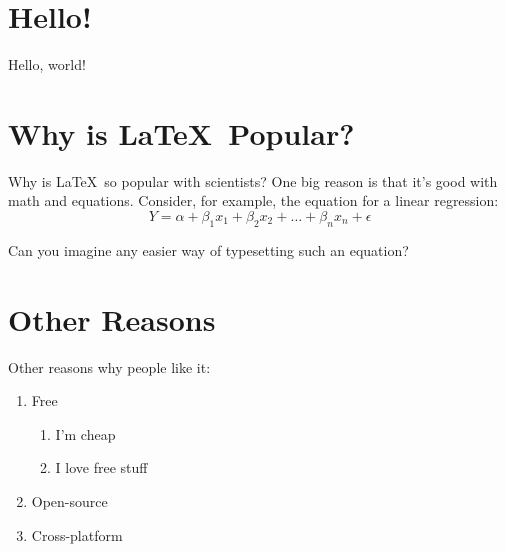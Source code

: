 \documentclass{article}
\begin{document}
\tableofcontents
\newpage

\section{Hello!}
Hello, world! \\

\section{Why is \LaTeX\ Popular?}
Why is \LaTeX\ so popular with scientists? One big reason is that it's good with math and equations. Consider, for example, the equation for a linear regression: $$Y = \alpha + \beta_1x_1 + \beta_2x_2 + \ldots + \beta_nx_n + \epsilon$$

Can you imagine any easier way of typesetting such an equation? \\

\section{Other Reasons}
\noindent
Other reasons why people like it:
\begin{enumerate}
	\item{Free}
	\begin{enumerate}
			\item{I'm cheap}
			\item{I love free stuff}
	\end{enumerate}
	\item{Open-source}
	\item{Cross-platform}
\end{enumerate}
	
\end{document}
